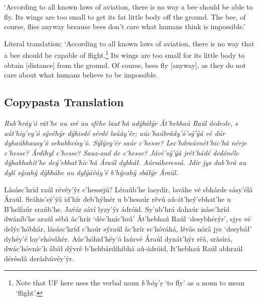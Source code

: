 \documentclass[a4paper, 12pt, twoside, openright, final]{book}
\let \w \textit
\begin{document}
\medskip\noindent
‘According to all known laws of aviation, there is no way a bee should be able to fly. Its wings are too
small to get its fat little body off the ground. The bee, of course, flies anyway because bees don't care
what humans think is impossible.’

\medskip\noindent
Literal translation: ‘According to all known laws of aviation, there is no way that a bee should be capable of flight.\footnote{
Note that UF here uses the verbal noun \w{b’hóy’ẹ} ‘to fly’ as a noun to mean ‘flight’.}
Its wings are too small for its little body to obtain [distance] from the ground. Of course, bees fly [anyway], as
they do not care about what humans believe to be impossible.

\subsection{Copypasta Translation}
{\itshape
Rub’hráy’ó rát’he au sré au sfèhe laut’hâ adŷbáłýr Át’hebhaú Raúl dedesle, s aút’hiy’ey’ó sývéhýr dýhisdé sérdé laúây’êr;
aúc’haúbrâdy’ó’sý’ýâ vé dúr dyhaúbhausy’ô sehabhvísy’ô. Sýlývy’ér saúr c’hesse? Lec’hdr\-aúv\-nét’hic’hâ nérje c’hesse?
Árdihyl c’hesse? Sauz-aud de c’hesse? Jávé’sý’ýâ jrét’hádé dedónéle dýha\-bha\-hit’he deý’ebhat’hic’hâ Áraúl dybháł.
Aúrsáheressá. Jdír jys dub’hrá au dylí sýcahý dýbháhe au dylýáv́áy’é b’hýcahý sbáłýr Áraúl.

Lásásc’hríd raúl révéy’ýr c’hessejú? Léraúb’he lasydír, lavâhe vé sbhárde sásy’élâ Áraúl. Sráhis’sý’ýâ id’hír deb’hýlnér
u b’hesaúr rêvú aû-át’heý’ebhat’he u B’helfaúr sraúb’he. Jav́ár sáví lyzy’ýr ádróid. Sy’u\-b’h\-rá dahaúr isásc’hríd
dwáníb’he araúl sébâ âc’hrír ‘dèc’hníc’hvâ’ Át’hebhaú Raúl ‘desybhérýr’, sjys vé delýc’hóbhár, lásásc’hríd c’haúr sýraúl
âc’hrír sc’hóváhá, lévás nórâ jys ‘desybáł’ dyhéy’é la\-y’e\-hó\-vâ\-hér. Aúc’hóhid’héy’ó laúrvé Áraúl dynát’hýr rêâ, srâsírá,
dwác’hóvníc’h âbáł dývrê b’hehbár\-di\-hi\-bhá aû-á\-dr\-ó\-id, It’hebhaú Raúl abhraúl dérésdâ derâdvâvéy’ýr.
}

\end{document}

